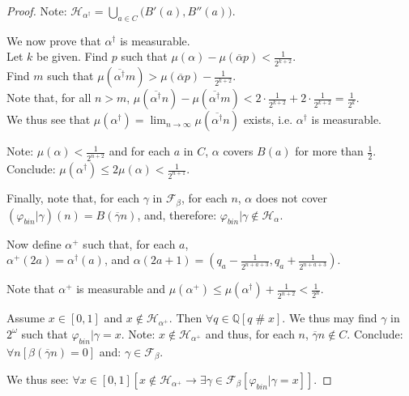 \documentclass[a4paper]{amsart}
\theoremstyle{plain}
\begin{document}
\begin{proof}
    
   
   Note: $\mathcal{H}_{\alpha^\dag} =\bigcup_{a\in C}\bigl(B'(a), B''(a)\bigr)$.
   
   We now prove that $\alpha^\dag$ is measurable. \\ Let $k$ be given. Find $p$ such that $\mu(\alpha)-\mu(\overline \alpha p) < \frac{1}{2^{k+2}}$. \\Find $m$ such that $\mu(\overline{\alpha^\dag}m)>\mu(\overline \alpha p)-\frac{1}{2^{k+2}}$. \\Note that, for all $n>m$, $\mu(\overline{\alpha^\dag}n) - \mu(\overline{\alpha^\dag} m)< 2\cdot\frac{1}{2^{k+2}} + 2\cdot\frac{1}{2^{k+2}} =\frac{1}{2^k}$. 
   \\We thus see that $\mu(\alpha^\dag)=\lim_{n\rightarrow\infty}\mu(\overline{\alpha^\dag}n)$ exists, i.e. $\alpha^\dag$ is measurable. 
   
   
  
   
   \smallskip Note: $\mu(\alpha)<\frac{1}{2^{n+2}}$ and for each $a$ in $C$,  $\alpha$ covers $B(a)$ for more than $\frac{1}{2}$. \\Conclude: $\mu(\alpha^\dag)\le 2\mu(\alpha)< \frac{1}{2^{n+1}}$. 
   
 
   
   \smallskip Finally, note that, for each $\gamma$ in $\mathcal{F}_\beta$, for each $n$, $\alpha$ does not cover \\$(\varphi_{bin}|\gamma)(n)= B(\overline \gamma n)$, and, therefore: $\varphi_{bin}|\gamma \notin \mathcal{H}_\alpha$. 
   
   
   Now define $\alpha^+$ such that,  for each $a$, \\ $\alpha^+(2a)= \alpha^\dag(a)$, and  $\alpha(2a+1)=(q_a-\frac{1}{2^{n+a+3}}, q_a+\frac{1}{2^{n+a+3}})$. 
   
    Note that $\alpha^+$ is measurable and $\mu(\alpha^+)\le \mu(\alpha^\dag) + \frac{1}{2^{n+2}}<\frac{1}{2^n}$.
 
   
   
   Assume $x\in [0,1]$ and  $x \notin \mathcal{H}_{\alpha^+}$. Then $\forall q \in \mathbb{Q}[q \;\#\; x]$. We thus may find $\gamma$ in $2^\omega$ such that $\varphi_{bin}|\gamma = x$.  Note: $x\notin\mathcal{H}_{\alpha^+}$  and thus, for each $n$, $\overline \gamma n\notin C$. Conclude: $\forall n[\beta(\overline \gamma n)=0]$ and: $\gamma \in \mathcal{F}_\beta$.
   
   We thus see: $\forall x \in [0,1][x \notin \mathcal{H}_{\alpha^+}\rightarrow \exists \gamma \in \mathcal{F}_\beta[\varphi_{bin}|\gamma = x]]$.  
\end{proof}
\end{document}
